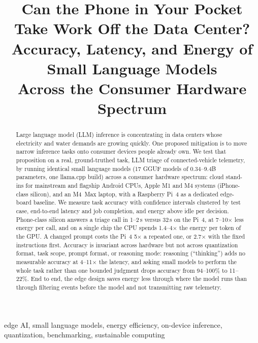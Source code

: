 \documentclass[conference]{IEEEtran}
\begin{document}
\title{Can the Phone in Your Pocket Take Work Off the Data Center?\\
Accuracy, Latency, and Energy of Small Language Models\\ Across the Consumer Hardware Spectrum}

\author{
}

\maketitle

\begin{abstract}
Large language model (LLM) inference is concentrating in data centers whose electricity and water demands are growing quickly. One proposed mitigation is to move narrow inference tasks onto consumer devices people already own. We test that proposition on a real, ground-truthed task, LLM triage of connected-vehicle telemetry, by running identical small language models (17 GGUF models of 0.34--9.4B parameters, one llama.cpp build) across a consumer hardware spectrum: cloud stand-ins for mainstream and flagship Android CPUs, Apple M1 and M4 systems (iPhone-class silicon), and an M4~Max laptop, with a Raspberry Pi~4 as a dedicated edge-board baseline. We measure task accuracy with confidence intervals clustered by test case, end-to-end latency and job completion, and energy above idle per decision. Phone-class silicon answers a triage call in 1--2\,s versus 32\,s on the Pi~4, at 7--10$\times$ less energy per call, and on a single chip the CPU spends 1.4--4$\times$ the energy per token of the GPU. A changed prompt costs the Pi~4 5$\times$ a repeated one, or 2.7$\times$ with the fixed instructions first. Accuracy is invariant across hardware but not across quantization format, task scope, prompt format, or reasoning mode: reasoning (``thinking'') adds no measurable accuracy at 4--11$\times$ the latency, and asking small models to perform the whole task rather than one bounded judgment drops accuracy from 94--100\% to 11--22\%. End to end, the edge design saves energy less through where the model runs than through filtering events before the model and not transmitting raw telemetry.
\end{abstract}

\begin{IEEEkeywords}
edge AI, small language models, energy efficiency, on-device inference, quantization, benchmarking, sustainable computing
\end{IEEEkeywords}
\end{document}

